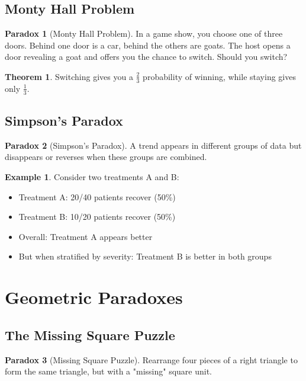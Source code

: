 \documentclass[11pt]{article}
\theoremstyle{definition}
\newtheorem{theorem}{Theorem}[section]
\newtheorem{example}{Example}[section]
\newtheorem{paradox}{Paradox}[section]
\begin{document}
\subsection{Monty Hall Problem}
\begin{paradox}[Monty Hall Problem]
In a game show, you choose one of three doors. Behind one door is a car, behind the others are goats. The host opens a door revealing a goat and offers you the chance to switch. Should you switch?
\end{paradox}

\begin{theorem}
Switching gives you a $\frac{2}{3}$ probability of winning, while staying gives only $\frac{1}{3}$.
\end{theorem}

\subsection{Simpson's Paradox}
\begin{paradox}[Simpson's Paradox]
A trend appears in different groups of data but disappears or reverses when these groups are combined.
\end{paradox}

\begin{example}
Consider two treatments A and B:
\begin{itemize}
    \item Treatment A: 20/40 patients recover (50\%)
    \item Treatment B: 10/20 patients recover (50\%)
    \item Overall: Treatment A appears better
    \item But when stratified by severity: Treatment B is better in both groups
\end{itemize}
\end{example}

\section{Geometric Paradoxes}

\subsection{The Missing Square Puzzle}
\begin{paradox}[Missing Square Puzzle]
Rearrange four pieces of a right triangle to form the same triangle, but with a "missing" square unit.
\end{paradox}
\end{document}
